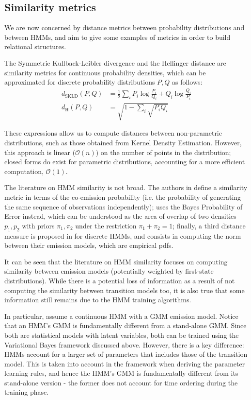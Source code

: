 \documentclass[pdftex,11pt,a4paper]{article}
\theoremstyle{definition}
\theoremstyle{remark}
\begin{document}
\subsection{Similarity metrics}
We are now concerned by distance metrics between probability distributions and between HMMs, and aim to give some examples of metrics in order to build relational structures.
\par The Symmetric Kullback-Leibler divergence and the Hellinger distance are similarity metrics for continuous probability densities, which can be approximated for discrete probability distributions $P, Q$ as follows:
\begin{align*}
d_{\text{SKLD}}(P, Q) &= \frac{1}{2}\sum_iP_i\log{\frac{P_i}{Q_i}} + Q_i\log{\frac{Q_i}{P_i}}\\
d_{\text{H}}(P, Q) &= \sqrt{1 - \sum_i \sqrt{P_iQ_i}}
\end{align*}
\par These expressions allow us to compute distances between non-parametric distributions, such as those obtained from Kernel Density Estimation. However, this approach is linear ($\mathcal{O}(n)$) on the number of points in the distribution; closed forms do exist for parametric distributions, accounting for a more efficient computation, $\mathcal{O}(1)$. 
\par The literature on HMM similarity is not broad. The authors in \cite{Lyngs1999} define a similarity metric in terms of the co-emission probability (i.e. the probability of generating the same sequence of observations independently); \cite{Bahlmann2001} uses the Bayes Probability of Error instead, which can be understood as the area of overlap of two densities $p_1, p_2$ with priors $\pi_1, \pi_2$ under the restriction $\pi_1+\pi_2 = 1$; finally, a third distance measure is proposed in \cite{Juang1985} for discrete HMMs, and consists in computing the norm between their emission models, which are empirical pdfs.
\par It can be seen that the literature on HMM similarity focuses on computing similarity between emission models (potentially weighted by first-state distributions). While there is a potential loss of information as a result of not computing the similarity between transition models too, it is also true that some information still remains due to the HMM training algorithms. 
\par In particular, assume a continuous HMM with a GMM emission model. Notice that an HMM's GMM is fundamentally different from a stand-alone GMM. Since both are statistical models with latent variables, both can be trained using the Variational Bayes framework discussed above. However, there is a key difference: HMMs account for a larger set of parameters that includes those of the transition model. This is taken into account in the framework when deriving the parameter learning rules, and hence the HMM's GMM is fundamentally different from its stand-alone version - the former does not account for time ordering during the training phase.
\end{document}
